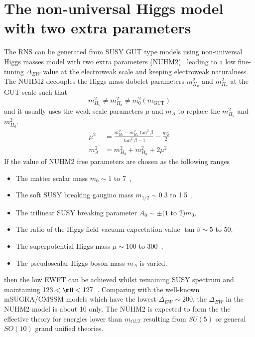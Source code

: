 \section{The non-universal Higgs model with two extra parameters}
\label{sec:susy_nuhm2}
The RNS can be generated from SUSY GUT type models using non-universal Higgs masses model with two extra parameters (NUHM2)~\cite{Ellis:2002wv, Ellis:2002iu, Baer:2004fu, Baer:2005bu} leading to a low fine-tuning $\Delta_{EW}$ value at the electroweak scale and keeping electroweak naturalness.
The NUHM2 decouples the Higgs mass dobelet parameters $m^{2}_{H_{u}}$ and $m^{2}_{H_{d}}$ at the GUT scale such that
%
\begin{equation}
    m^{2}_{H_{u}} \neq m^{2}_{H_{d}} \neq m^{2}_{0}(m_{\text{GUT}})
    \label{eq:susy_nuhm2_decouple}
\end{equation}
%
and it usually uses the weak scale parameters $\mu$ and $m_{A}$ to replace the $m^{2}_{H_{u}}$ and $m^{2}_{H_{d}}$.
%
\begin{align}
    \mu^{2} &= \frac{m^{2}_{H_{d}} - m^{2}_{H_{u}}\tan^{2}\beta}{\tan^{2}\beta - 1} - \frac{m^{2}_{Z}}{2}\\
    m^{2}_{A} &= m^{2}_{H_{d}} + m^{2}_{H_{u}} + 2\mu^{2}
    \label{eq:susy_weak_scale_parameters}
\end{align}
%
If the value of NUHM2 free parameters are chosen as the following ranges
%
\begin{itemize}
    \item The matter scalar mass $m_{0} \sim 1$ to 7~{\TeV},
    \item The soft SUSY breaking gaugino mass $m_{1/2} \sim 0.3$ to 1.5~{\TeV},
    \item The trilinear SUSY breaking parameter $A_{0} \sim \pm(1$ to $2) m_{0}$,
    \item The  ratio of the Higgs field vacuum expectation value $\tan\beta \sim 5$ to 50,
    \item The superpotential Higgs mass $\mu \sim 100$ to 300~{\GeV},
    \item The pseudoscalar Higgs boson mass $m_{A}$ is varied.
\end{itemize}
%
then the low EWFT can be achieved whilst remaining SUSY spectrum and maintaining $123 < \mH < 127$~{\GeV}.
Comparing with the well-known mSUGRA/CMSSM models which have the lowest $\Delta_{EW} \sim 200$, the $\Delta_{EW}$ in the NUHM2 model is about 10 only.
The NUHM2 is expected to form the the effective theory for energies lower than $m_{GUT}$ resulting from $SU(5)$ or general $SO(10)$ grand unified theories.
